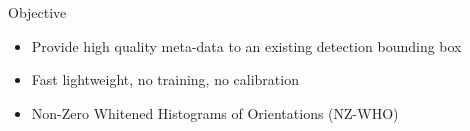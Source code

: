 \documentclass[serif,mathserif,final]{beamer}
\DeclareMathOperator*{\var}{Var} %
\newcommand{\1}{\mathbb{I}} %
\begin{document}
\begin{frame}{}
\begin{columns}[t]
\begin{column}{0.24\linewidth}


      \begin{block}{Objective}
        \begin{itemize}
          \item Provide high quality meta-data to an existing detection
            bounding box
          \item Fast lightweight, {\color{red} no training, no calibration}
          \item Non-Zero Whitened Histograms of Orientations (NZ-WHO)
        \end{itemize}
      \end{block}



\end{column}
\end{columns}
\end{frame}
\end{document}
